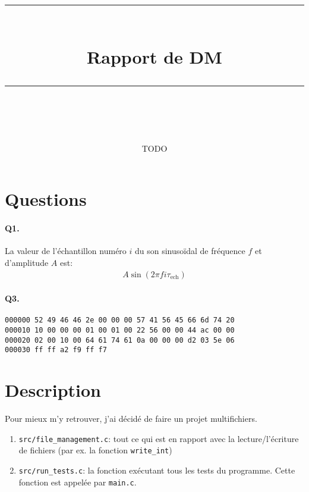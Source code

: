 \documentclass[11pt]{article} %
\title{
    \vspace{10pt} %
    \rule{\linewidth}{1pt}\\ %
    \vspace{10pt} %
    {\huge Rapport de DM}\\ %
    \rule{\linewidth}{1pt}\\ %
    \vspace{5pt} %
}
\date{\printdate{2024-12-29}}
\author{TODO}
\newcommand{\nbsp}{\nobreakspace}
\begin{document}
\maketitle{}

\section{Questions}
\paragraph{Q1.}
La valeur de l’échantillon numéro $i$ du son sinusoïdal de fréquence $f$ et
d’amplitude $A$ est\nbsp:
\begin{align*}
A \sin(2\pi f i \tau_\text{ech})
\end{align*}

\paragraph{Q3.}
\nbsp

\begin{lstlisting}
000000 52 49 46 46 2e 00 00 00 57 41 56 45 66 6d 74 20
000010 10 00 00 00 01 00 01 00 22 56 00 00 44 ac 00 00
000020 02 00 10 00 64 61 74 61 0a 00 00 00 d2 03 5e 06
000030 ff ff a2 f9 ff f7
\end{lstlisting}

\section{Description}

Pour mieux m’y retrouver, j’ai décidé de faire un projet multifichiers.
\begin{enumerate}
    \item \verb|src/file_management.c|\nbsp: tout ce qui est en rapport avec la
        lecture/l’écriture de fichiers (par ex. la fonction \verb|write_int|)
    \item \verb|src/run_tests.c|\nbsp: la fonction exécutant tous les tests
        du programme. Cette fonction est appelée par \verb|main.c|.
\end{enumerate}
\end{document}
